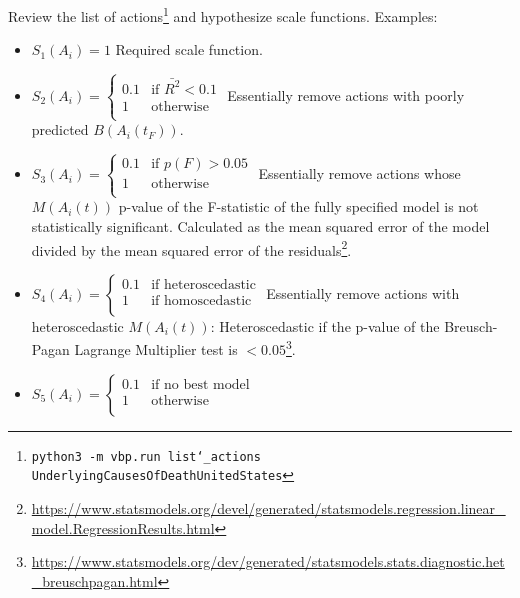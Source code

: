 \documentclass[12pt, a4paper, twocolumn]{article}
\begin{document}
Review the list of actions\footnote{\texttt{python3 -m vbp.run list\char`_actions UnderlyingCausesOfDeathUnitedStates}} and hypothesize scale functions. Examples:

\begin{itemize}
\item $S_1(A_i) = 1$
                \newline\newline
                Required scale function.
\item $S_2(A_i) = \begin{cases}\text{0.1} & \mbox{if } \bar{R^2} < 0.1 \\ \text{1} & \mbox{otherwise} \\ \end{cases}$
                \newline\newline
                Essentially remove actions with poorly predicted $B(A_i(t_F))$.
\item $S_3(A_i) = \begin{cases}\text{0.1} & \mbox{if } p(F) > 0.05 \\ \text{1} & \mbox{otherwise} \\ \end{cases}$
                \newline\newline
                Essentially remove actions whose $M(A_i(t))$ p-value of the F-statistic of the fully specified model is not statistically significant. Calculated as the mean squared error of the model divided by the mean squared error of the residuals\footnote{\url{https://www.statsmodels.org/devel/generated/statsmodels.regression.linear_model.RegressionResults.html}}.
\item $S_4(A_i) = \begin{cases}\text{0.1} & \mbox{if heteroscedastic} \\ \text{1} & \mbox{if homoscedastic} \\ \end{cases}$
                \newline\newline
                Essentially remove actions with heteroscedastic $M(A_i(t))$: Heteroscedastic if the p-value of the Breusch-Pagan Lagrange Multiplier test is $< 0.05$\footnote{\url{https://www.statsmodels.org/dev/generated/statsmodels.stats.diagnostic.het_breuschpagan.html}}.
\item $S_5(A_i) = \begin{cases}\text{0.1} & \mbox{if no best model} \\ \text{1} & \mbox{otherwise} \\ \end{cases}$

\end{itemize}
\end{document}
